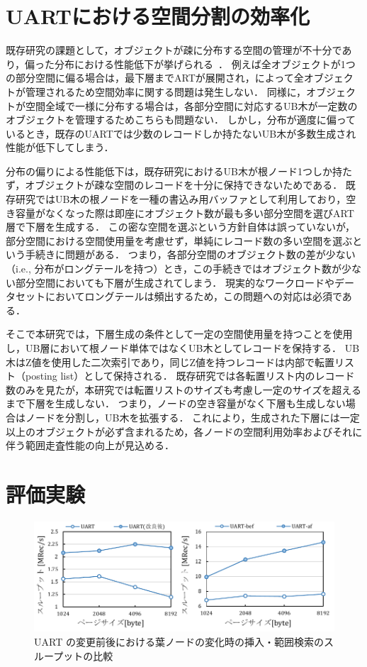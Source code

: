 \chapter{UARTにおける空間分割の効率化}

既存研究の課題として，オブジェクトが疎に分布する空間の管理が不十分であり，偏った分布における性能低下が挙げられる~\cite{deim:Suzuki2023}．
例えば全オブジェクトが1つの部分空間に偏る場合は，最下層までARTが展開され，\BTree{}によって全オブジェクトが管理されるため空間効率に関する問題は発生しない．
同様に，オブジェクトが空間全域で一様に分布する場合は，各部分空間に対応するUB木が一定数のオブジェクトを管理するためこちらも問題ない．
しかし，分布が適度に偏っているとき，既存のUARTでは少数のレコードしか持たないUB木が多数生成され性能が低下してしまう．

分布の偏りによる性能低下は，既存研究におけるUB木が根ノード1つしか持たず，オブジェクトが疎な空間のレコードを十分に保持できないためである．
既存研究ではUB木の根ノードを一種の書込み用バッファとして利用しており，空き容量がなくなった際は即座にオブジェクト数が最も多い部分空間を選びART層で下層を生成する．
この密な空間を選ぶという方針自体は誤っていないが，部分空間における空間使用量を考慮せず，単純にレコード数の多い空間を選ぶという手続きに問題がある．
つまり，各部分空間のオブジェクト数の差が少ない（i.e., 分布がロングテールを持つ）とき，この手続きではオブジェクト数が少ない部分空間においても下層が生成されてしまう．
現実的なワークロードやデータセットにおいてロングテールは頻出するため，この問題への対応は必須である．

そこで本研究では，下層生成の条件として一定の空間使用量を持つことを使用し，UB層において根ノード単体ではなくUB木としてレコードを保持する．
UB木はZ値を使用した二次索引であり，同じZ値を持つレコードは内部で転置リスト（posting list）として保持される．
既存研究では各転置リスト内のレコード数のみを見たが，本研究では転置リストのサイズも考慮し一定のサイズを超えるまで下層を生成しない．
つまり，ノードの空き容量がなく下層も生成しない場合はノードを分割し，UB木を拡張する．
これにより，生成された下層には一定以上のオブジェクトが必ず含まれるため，各ノードの空間利用効率およびそれに伴う範囲走査性能の向上が見込める．





\chapter{評価実験}


\begin{figure}[t]
  \centering
  \includegraphics{./figures/graph-pagesize.pdf}
  \caption{UART の変更前後における葉ノードの変化時の挿入・範囲検索のスループットの比較}
  \label{graph:pagesize}
\end{figure}




